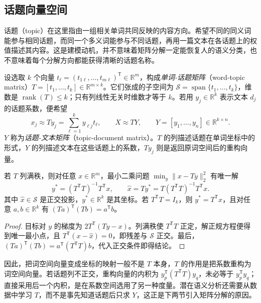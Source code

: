 \subsection{话题向量空间}
\label{subsec:lh-lsa-topic-space}

话题（topic）在这里指由一组相关单词共同反映的内容方向。希望不同的同义词能参与相同话题，而同一个多义词能参与不同话题，再用一篇文本在各话题上的权值描述其内容。这是建模动机，并不意味着矩阵分解一定能恢复人的语义分类，也不意味着每个分解方向都能获得清晰的话题名称。

设选取 $k$ 个向量 $t_\ell=(t_{1\ell},\ldots,t_{m\ell})^{\mathsf T}\in\mathbb R^m$，构成\emph{单词-话题矩阵}（word-topic matrix）$T=[t_1,\ldots,t_k]\in\mathbb R^{m\times k}$。它们张成的子空间为 $\mathcal S=\operatorname{span}\{t_1,\ldots,t_k\}$，维数是 $\operatorname{rank}(T)\leq k$；只有列线性无关时维数才等于 $k$。若用 $y_j\in\mathbb R^k$ 表示文本 $d_j$ 的话题系数，便希望
\begin{equation}
x_j\approx Ty_j=\sum_{\ell=1}^k y_{\ell j}t_\ell,
\qquad
X\approx TY,\qquad
Y=[y_1,\ldots,y_n]\in\mathbb R^{k\times n}.
\label{eq:lh-lsa-topic-factorization}
\end{equation}
$Y$ 称为\emph{话题-文本矩阵}（topic-document matrix）。$T$ 的列描述话题在单词坐标中的形式，$Y$ 的列描述文本在这些话题上的系数，$Ty_j$ 则是返回原词空间后的重构向量。

\begin{proposition}[坐标、投影与内积]
\label{prop:lh-lsa-projection}
若 $T$ 列满秩，则对任意 $x\in\mathbb R^m$，最小二乘问题 $\min_y\|x-Ty\|_2^2$ 有唯一解
\begin{equation}
y^*=(T^{\mathsf T}T)^{-1}T^{\mathsf T}x,
\qquad
\widehat x=Ty^*=T(T^{\mathsf T}T)^{-1}T^{\mathsf T}x.
\label{eq:lh-lsa-general-projection}
\end{equation}
其中 $\widehat x\in\mathcal S$ 是正交投影，$y^*\in\mathbb R^k$ 是其坐标。若 $T^{\mathsf T}T=I_k$，则 $y^*=T^{\mathsf T}x$，且对任意 $a,b\in\mathbb R^k$ 有 $(Ta)^{\mathsf T}(Tb)=a^{\mathsf T}b$。
\end{proposition}
\begin{proof}
目标对 $y$ 的梯度为 $2T^{\mathsf T}(Ty-x)$。列满秩使 $T^{\mathsf T}T$ 正定，解正规方程便得到唯一最小点，且 $T^{\mathsf T}(x-\widehat x)=0$，即残差与 $\mathcal S$ 正交。最后，$(Ta)^{\mathsf T}(Tb)=a^{\mathsf T}(T^{\mathsf T}T)b$，代入正交条件即得结论。
\end{proof}

因此，把词空间向量变成坐标的映射一般不是 $T$ 本身，$T$ 的作用是把系数重构为词空间向量。若话题列不正交，重构向量的内积为 $y_p^{\mathsf T}(T^{\mathsf T}T)y_q$，未必等于 $y_p^{\mathsf T}y_q$；直接采用后一个内积，是在系数空间选用了另一种度量。潜在语义分析还需要从数据中学习 $T$，而不是事先知道话题后只求 $Y$，这正是下两节引入矩阵分解的原因。

